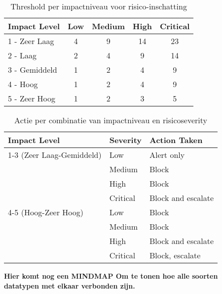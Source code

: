 \begin{table}[h]
    \centering
    \small
    \begin{tabular}{l c c c c}
        \toprule
        \textbf{Impact Level} & \textbf{Low} & \textbf{Medium} & \textbf{High} & \textbf{Critical} \\
        \midrule
        1 - Zeer Laag     &  4   & 9   & 14  &  23 \\
        2 - Laag          &  2   & 4   & 9   &  14 \\
        3 - Gemiddeld     &  1   & 2   & 4   &  9 \\
        4 - Hoog          &  1   & 2   & 4   &  9 \\
        5 - Zeer Hoog     &  1   & 2   & 3   &  5 \\
        \bottomrule
    \end{tabular}
    \caption{Threshold per impactniveau voor risico-inschatting}
    \label{tab:risico_thresholds}
\end{table}


\begin{table}[h]
    \centering
    \small
    \begin{tabular}{l l l}
        \toprule
        \textbf{Impact Level} & \textbf{Severity} & \textbf{Action Taken} \\
        \midrule
        1-3 (Zeer Laag-Gemiddeld) & Low      & Alert only \\
                                  & Medium   & Block \\
                                  & High     & Block \\
                                  & Critical & Block and escalate \\
        4-5 (Hoog-Zeer Hoog)      & Low      & Block \\
                                  & Medium   & Block \\
                                  & High     & Block and escalate \\
                                  & Critical & Block, escalate \\
        \bottomrule
    \end{tabular}
    \caption{Actie per combinatie van impactniveau en risicoseverity}
    \label{tab:risico_acties}
\end{table}



\textbf{Hier komt nog een MINDMAP Om te tonen hoe alle soorten datatypen met elkaar verbonden zijn.}

